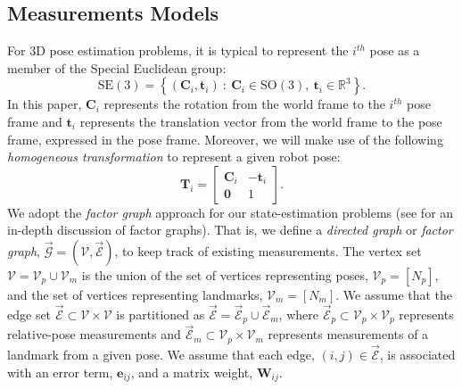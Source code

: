 \documentclass[lettersize,journal]{IEEEtran}
\newcommand{\EdgeSet}{\vec{\bm{\mathcal{E}}}}
\newcommand{\VertSetP}{\bm{\mathcal{V}}_p}
\newcommand{\VertSetM}{\bm{\mathcal{V}}_m}
\newcommand{\VertSet}{\bm{\mathcal{V}}}
\newcommand{\Graph}{\vec{\bm{\mathcal{G}}}}
\begin{document}
\subsection{Measurements Models}\label{sec:MeasModels}

For 3D pose estimation problems, it is typical to represent the $i^{th}$ pose as a member of the Special Euclidean group:
\begin{equation}\label{eqn:pose_var}
	\mbox{SE}(3) = \left\{(\bm{C}_i, \bm{t}_i)~:~\bm{C}_i\in \mbox{SO}(3),~ \bm{t}_i\in \mathbb{R}^3\right\}.
\end{equation}
In this paper, $\bm{C}_i$ represents the rotation from the world frame to the $i^{th}$ pose frame and $\bm{t}_i$ represents the translation vector from the world frame to the pose frame, expressed in the pose frame. Moreover, we will make use of the following \textit{homogeneous transformation} to represent a given robot pose:
\begin{equation}
	\bm{T}_i = \begin{bmatrix}
		\bm{C}_i & -\bm{t}_i \\ \bm{0} & 1
	\end{bmatrix}.
\end{equation}
We adopt the \emph{factor graph} approach for our state-estimation problems (see \cite{dellaertFactorGraphsRobot2017} for an in-depth discussion of factor graphs). That is, we define a \textit{directed graph} or \emph{factor graph}, $ \Graph = \left(\VertSet, \EdgeSet\right)$, to keep track of existing measurements. The vertex set $ \VertSet = \VertSetP \cup \VertSetM $ is the union of the set of vertices representing poses, $ \VertSetP =\left[N_p\right]$, and the set of vertices representing landmarks, $ \VertSetM = \left[N_m\right]$. We assume that the edge set $\EdgeSet \subset \VertSet \times \VertSet$ is partitioned as $\EdgeSet= \EdgeSet_p \cup \EdgeSet_m$, where $\EdgeSet_p\subset \VertSet_p\times \VertSet_p$ represents relative-pose measurements and $\EdgeSet_m\subset \VertSet_p\times \VertSet_m$ represents measurements of a landmark from a given pose. We assume that each edge, $(i,j)\in \EdgeSet$, is associated with an error term, $\bm{e}_{ij}$, and a matrix weight, $\bm{W}_{ij}$.
\end{document}
